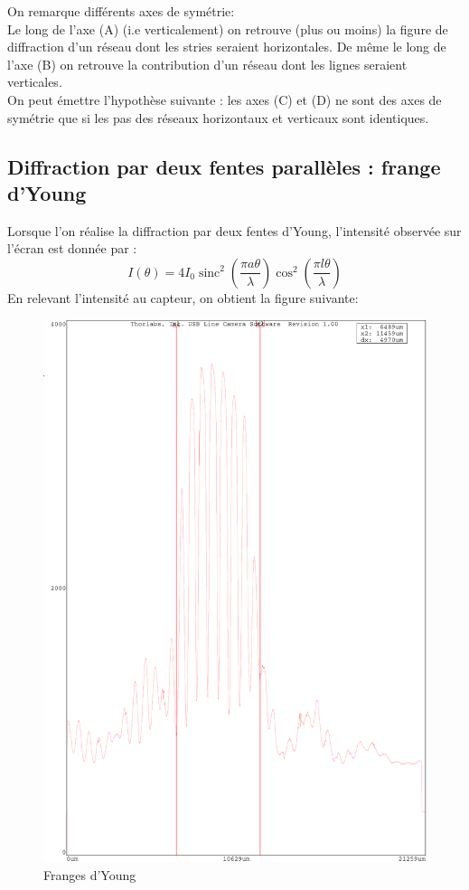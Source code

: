 \documentclass[12pt,a4paper]{article}
\DeclareMathOperator{\sinc}{sinc}
\begin{document}
	On remarque différents axes de symétrie:\\
	Le long de l'axe (A) (i.e verticalement) on retrouve (plus ou moins) la figure de diffraction d'un réseau dont les stries seraient horizontales. De même le long de l'axe (B) on retrouve la contribution d'un réseau dont les lignes seraient verticales.\\
	On peut émettre l'hypothèse suivante : les axes (C) et (D) ne sont des axes de symétrie que si les pas des réseaux horizontaux et verticaux sont identiques.
	\subsection{Diffraction par deux fentes parallèles : frange d'Young}
	Lorsque l'on réalise la diffraction par deux fentes d'Young, l'intensité observée sur l'écran est donnée par :
	$$I(\theta)=4I_0\sinc^2\left( {\dfrac{\pi a \theta}{\lambda}}\right) \cos^2\left(\dfrac{\pi l \theta}{\lambda}\right)$$
	En relevant l'intensité au capteur, on obtient la figure suivante:
	\begin{figure}[h]
		\centering
		\includegraphics[scale=0.45]{"res/Young OK"}
		\caption{Franges d'Young}
	\end{figure}
	
\end{document}
